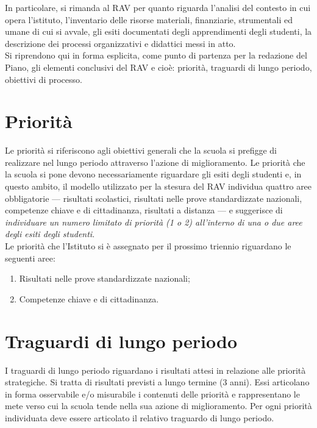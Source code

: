 \documentclass[12pt,a4paper,oneside]{memoir}
\begin{document}
In particolare, si rimanda al RAV per quanto riguarda l'analisi del contesto in cui opera l'istituto, l'inventario delle risorse materiali, finanziarie, strumentali ed umane di cui si avvale, gli esiti documentati degli apprendimenti degli studenti, la descrizione dei processi organizzativi e didattici messi in atto.\\

Si riprendono qui in forma esplicita, come punto di partenza per la redazione del Piano, gli elementi conclusivi del RAV e cioè: priorità, traguardi di lungo periodo, obiettivi di processo.\\

\section{Priorità}
Le priorità si riferiscono agli obiettivi generali che la scuola si prefigge di realizzare nel lungo periodo attraverso l'azione di miglioramento. Le priorità che la scuola si pone devono necessariamente riguardare gli esiti degli studenti e, in questo ambito, il modello utilizzato per la stesura del RAV individua quattro aree obbligatorie --- risultati scolastici, risultati nelle prove standardizzate nazionali, competenze chiave e di cittadinanza, risultati a distanza --- e suggerisce di \textit{individuare un numero limitato di priorità (1 o 2) all'interno di una o due aree degli esiti degli studenti}.\\

Le priorità che l'Istituto si è assegnato per il prossimo triennio riguardano le seguenti aree:
\begin{enumerate} \label{priorità}
\item Risultati nelle prove standardizzate nazionali;
\item Competenze chiave e di cittadinanza.
\end{enumerate}

\section{Traguardi di lungo periodo}
I traguardi di lungo periodo riguardano i risultati attesi in relazione alle priorità strategiche. Si tratta di risultati previsti a lungo termine (3 anni). Essi articolano in forma osservabile e/o misurabile i contenuti delle priorità e rappresentano le mete verso cui la scuola tende nella sua azione di miglioramento. Per ogni priorità individuata deve essere articolato il relativo traguardo di lungo periodo.\\
\end{document}
